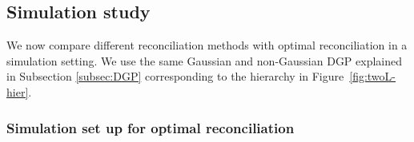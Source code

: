 \documentclass[12pt]{article}
\def\E{\text{E}}
\theoremstyle{definition}
\begin{document}
%

\subsection{Simulation study}\label{sec:Bootsrap-sim}

We now compare different reconciliation methods with optimal reconciliation in a simulation setting. We use the same Gaussian and non-Gaussian DGP explained in Subsection \ref{subsec:DGP} corresponding to the hierarchy in Figure~\ref{fig:twoL-hier}.



\subsubsection{Simulation set up for optimal reconciliation}
\end{document}
